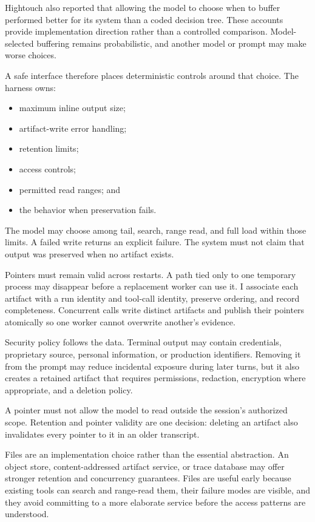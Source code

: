 Hightouch also reported that allowing the model to choose when to buffer performed better for its system than a coded decision tree. These accounts provide implementation direction rather than a controlled comparison. Model-selected buffering remains probabilistic, and another model or prompt may make worse choices.


A safe interface therefore places deterministic controls around that choice. The harness owns:

\begin{itemize}
\tightlist
\item
  maximum inline output size;
\item
  artifact-write error handling;
\item
  retention limits;
\item
  access controls;
\item
  permitted read ranges; and
\item
  the behavior when preservation fails.
\end{itemize}

The model may choose among tail, search, range read, and full load within those limits. A failed write returns an explicit failure. The system must not claim that output was preserved when no artifact exists.

Pointers must remain valid across restarts. A path tied only to one temporary process may disappear before a replacement worker can use it. I associate each artifact with a run identity and tool-call identity, preserve ordering, and record completeness. Concurrent calls write distinct artifacts and publish their pointers atomically so one worker cannot overwrite another's evidence.

Security policy follows the data. Terminal output may contain credentials, proprietary source, personal information, or production identifiers. Removing it from the prompt may reduce incidental exposure during later turns, but it also creates a retained artifact that requires permissions, redaction, encryption where appropriate, and a deletion policy.

A pointer must not allow the model to read outside the session's authorized scope. Retention and pointer validity are one decision: deleting an artifact also invalidates every pointer to it in an older transcript.

Files are an implementation choice rather than the essential abstraction. An object store, content-addressed artifact service, or trace database may offer stronger retention and concurrency guarantees. Files are useful early because existing tools can search and range-read them, their failure modes are visible, and they avoid committing to a more elaborate service before the access patterns are understood.

